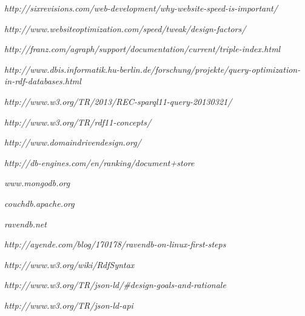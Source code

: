 
\def\bibname{Bibliography}
\begin{thebibliography}{99}
\addcontentsline{toc}{chapter}{\bibname}


	\emph{http://sixrevisions.com/web-development/why-website-speed-is-important/}

	\emph{http://www.websiteoptimization.com/speed/tweak/design-factors/}

	\emph{http://franz.com/agraph/support/documentation/current/triple-index.html}

	\emph{http://www.dbis.informatik.hu-berlin.de/forschung/\newline projekte/query-optimization-in-rdf-databases.html}

	\emph{http://www.w3.org/TR/2013/REC-sparql11-query-20130321/}

	\emph{http://www.w3.org/TR/rdf11-concepts/}
	
	\emph{http://www.domaindrivendesign.org/}
	
	\emph{http://db-engines.com/en/ranking/document+store}
	
	\emph{www.mongodb.org}
	
	\emph{couchdb.apache.org}

	\emph{ravendb.net}
	
	\emph{http://ayende.com/blog/170178/ravendb-on-linux-first-steps}

	\emph{http://www.w3.org/wiki/RdfSyntax}

	\emph{http://www.w3.org/TR/json-ld/\#design-goals-and-rationale}

	\emph{http://www.w3.org/TR/json-ld-api}

\end{thebibliography}
